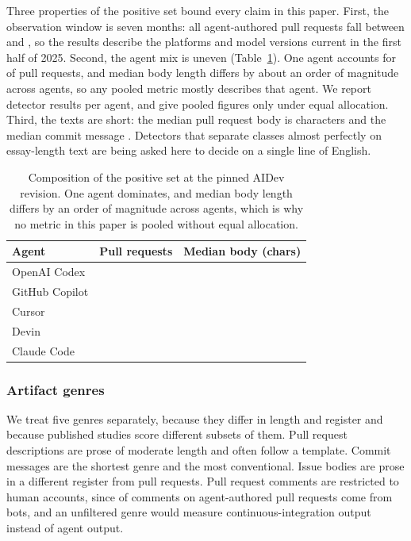 Three properties of the positive set bound every claim in this paper. First, the
observation window is seven months: all agent-authored pull requests fall between
\AidevWindowStart{} and \AidevWindowEnd{}, so the results describe the platforms and
model versions current in the first half of 2025. Second, the agent mix is uneven
(Table~\ref{tab:agentmix}). One agent accounts for \AidevTopAgentShare{} of pull requests,
and median body length differs by about an order of magnitude across agents, so any
pooled metric mostly describes that agent. We report detector results per agent, and
give pooled figures only under equal allocation. Third, the texts are short: the median
pull request body is \AidevBodyMedian{} characters and the median commit message
\AidevCommitMsgMedian{}. Detectors that separate classes almost perfectly on
essay-length text are being asked here to decide on a single line of English.

\begin{table}[t]
\caption{Composition of the positive set at the pinned AIDev revision. One agent
dominates, and median body length differs by an order of magnitude across agents, which
is why no metric in this paper is pooled without equal allocation.}
\label{tab:agentmix}
\small
\begin{tabular*}{\textwidth}{@{\extracolsep{\fill}}lrr@{}}
\toprule
Agent & Pull requests & Median body (chars) \\
\midrule
OpenAI Codex & \AgentOpenAICodexPRs{} & \AgentOpenAICodexBodyMedian{} \\
GitHub Copilot & \AgentCopilotPRs{} & \AgentCopilotBodyMedian{} \\
Cursor & \AgentCursorPRs{} & \AgentCursorBodyMedian{} \\
Devin & \AgentDevinPRs{} & \AgentDevinBodyMedian{} \\
Claude Code & \AgentClaudeCodePRs{} & \AgentClaudeCodeBodyMedian{} \\
\bottomrule
\end{tabular*}
\end{table}

\subsubsection{Artifact genres}
\label{sec:groundtruth:genres}

We treat five genres separately, because they differ in length and register and because
published studies score different subsets of them. Pull request descriptions are prose
of moderate length and often follow a template. Commit messages are the shortest genre
and the most conventional. Issue bodies are prose in a different register from pull
requests. Pull request comments are restricted to human accounts, since
\AidevCommentBotShare{} of comments on agent-authored pull requests come from bots, and
an unfiltered genre would measure continuous-integration output instead of agent output.

